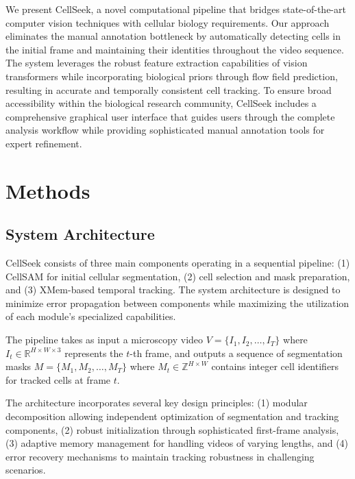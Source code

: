 \documentclass[12pt]{article}
\begin{document}
We present CellSeek, a novel computational pipeline that bridges state-of-the-art computer vision techniques with cellular biology requirements. Our approach eliminates the manual annotation bottleneck by automatically detecting cells in the initial frame and maintaining their identities throughout the video sequence. The system leverages the robust feature extraction capabilities of vision transformers while incorporating biological priors through flow field prediction, resulting in accurate and temporally consistent cell tracking. To ensure broad accessibility within the biological research community, CellSeek includes a comprehensive graphical user interface that guides users through the complete analysis workflow while providing sophisticated manual annotation tools for expert refinement.

\section{Methods}

\subsection{System Architecture}


CellSeek consists of three main components operating in a sequential pipeline: (1) CellSAM for initial cellular segmentation, (2) cell selection and mask preparation, and (3) XMem-based temporal tracking. The system architecture is designed to minimize error propagation between components while maximizing the utilization of each module's specialized capabilities.

The pipeline takes as input a microscopy video $V = \{I_1, I_2, \ldots, I_T\}$ where $I_t \in \mathbb{R}^{H \times W \times 3}$ represents the $t$-th frame, and outputs a sequence of segmentation masks $M = \{M_1, M_2, \ldots, M_T\}$ where $M_t \in \mathbb{Z}^{H \times W}$ contains integer cell identifiers for tracked cells at frame $t$.

The architecture incorporates several key design principles: (1) modular decomposition allowing independent optimization of segmentation and tracking components, (2) robust initialization through sophisticated first-frame analysis, (3) adaptive memory management for handling videos of varying lengths, and (4) error recovery mechanisms to maintain tracking robustness in challenging scenarios.
\end{document}
